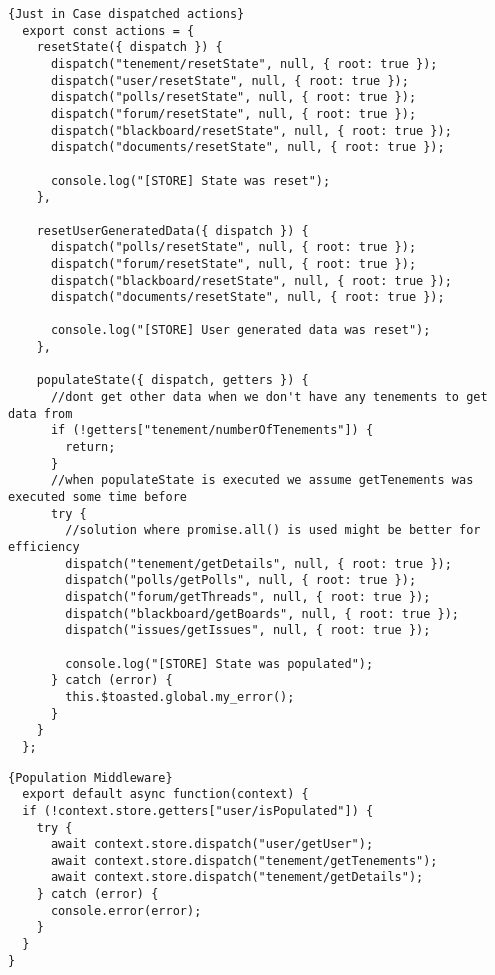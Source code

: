 \begin{lstlisting}[caption=Just in Case dispatched actions, captionpos=b, style=htmlcssjs, label=jicdispa]{Just in Case dispatched actions}
  export const actions = {
    resetState({ dispatch }) {
      dispatch("tenement/resetState", null, { root: true });
      dispatch("user/resetState", null, { root: true });
      dispatch("polls/resetState", null, { root: true });
      dispatch("forum/resetState", null, { root: true });
      dispatch("blackboard/resetState", null, { root: true });
      dispatch("documents/resetState", null, { root: true });
  
      console.log("[STORE] State was reset");
    },
  
    resetUserGeneratedData({ dispatch }) {
      dispatch("polls/resetState", null, { root: true });
      dispatch("forum/resetState", null, { root: true });
      dispatch("blackboard/resetState", null, { root: true });
      dispatch("documents/resetState", null, { root: true });
  
      console.log("[STORE] User generated data was reset");
    },
  
    populateState({ dispatch, getters }) {
      //dont get other data when we don't have any tenements to get data from
      if (!getters["tenement/numberOfTenements"]) {
        return;
      }
      //when populateState is executed we assume getTenements was executed some time before
      try {
        //solution where promise.all() is used might be better for efficiency
        dispatch("tenement/getDetails", null, { root: true });
        dispatch("polls/getPolls", null, { root: true });
        dispatch("forum/getThreads", null, { root: true });
        dispatch("blackboard/getBoards", null, { root: true });
        dispatch("issues/getIssues", null, { root: true });
  
        console.log("[STORE] State was populated");
      } catch (error) {
        this.$toasted.global.my_error();
      }
    }
  };
\end{lstlisting}


\begin{lstlisting}[caption=Population Middleware, captionpos=b, style=htmlcssjs, label=popmiddleware]{Population Middleware}
  export default async function(context) {
  if (!context.store.getters["user/isPopulated"]) {
    try {
      await context.store.dispatch("user/getUser");
      await context.store.dispatch("tenement/getTenements");
      await context.store.dispatch("tenement/getDetails");
    } catch (error) {
      console.error(error);
    }
  }
}
\end{lstlisting}
